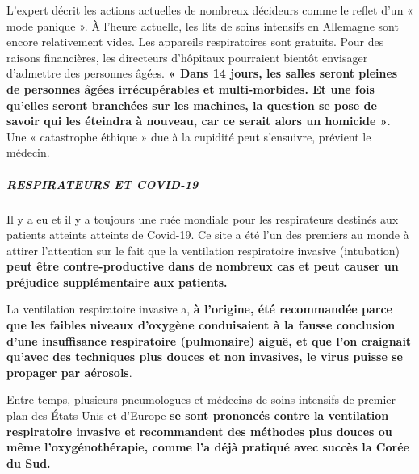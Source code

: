 L'expert décrit les actions actuelles de nombreux décideurs comme le
reflet d'un « mode panique ». À l'heure actuelle, les lits de soins
intensifs en Allemagne sont encore relativement vides. Les appareils
respiratoires sont gratuits. Pour des raisons financières, les
directeurs d'hôpitaux pourraient bientôt envisager d'admettre des
personnes âgées. \textbf{« Dans 14 jours, les salles seront pleines de
personnes âgées irrécupérables et multi-morbides. Et une fois qu'elles
seront branchées sur les machines, la question se pose de savoir qui les
éteindra à nouveau, car ce serait alors un homicide »}. Une «
catastrophe éthique » due à la cupidité peut s'ensuivre, prévient le
médecin.

\hypertarget{respirateurs-et-covid-19}{%
\subparagraph{\texorpdfstring{\textbf{RESPIRATEURS ET
COVID-19}}{RESPIRATEURS ET COVID-19}}\label{respirateurs-et-covid-19}}

Il y a eu et il y a toujours une ruée mondiale pour les respirateurs
destinés aux patients atteints atteints de Covid-19. Ce site a été l'un
des premiers au monde à attirer l'attention sur le fait que la
ventilation respiratoire invasive (intubation) \textbf{peut être
contre-productive dans de nombreux cas et peut causer un préjudice
supplémentaire aux patients.}

La ventilation respiratoire invasive a, \textbf{à l'origine, été
recommandée parce que les faibles niveaux d'oxygène conduisaient à la
fausse conclusion d'une insuffisance respiratoire (pulmonaire) aiguë, et
que l'on craignait qu'avec des techniques plus douces et non invasives,
le virus puisse se propager par aérosols}.

Entre-temps, plusieurs pneumologues et médecins de soins intensifs de
premier plan des États-Unis et d'Europe \textbf{se sont prononcés contre
la ventilation respiratoire invasive et} \textbf{recommandent des
méthodes plus douces ou même l'oxygénothérapie, comme l'a déjà pratiqué
avec succès la Corée du Sud.}

